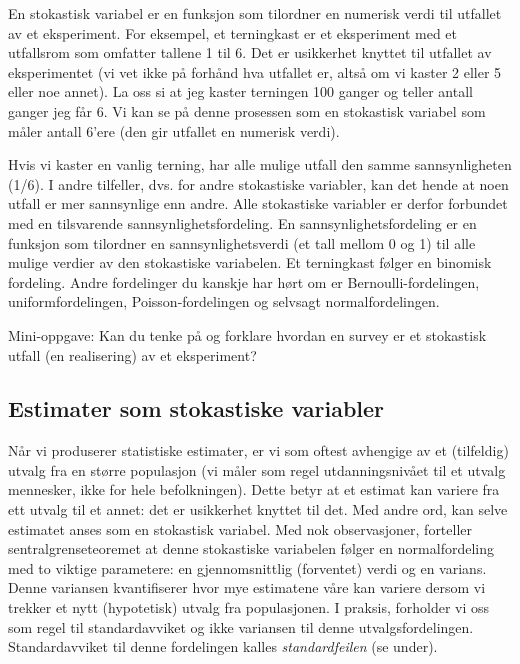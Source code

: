 \documentclass[
  norsk,
  letterpaper,
  DIV=11,
  numbers=noendperiod]{scrreprt}
\theoremstyle{definition}
\theoremstyle{remark}
\begin{document}
En stokastisk variabel er en funksjon som tilordner en numerisk verdi
til utfallet av et eksperiment. For eksempel, et terningkast er et
eksperiment med et utfallsrom som omfatter tallene 1 til 6. Det er
usikkerhet knyttet til utfallet av eksperimentet (vi vet ikke på forhånd
hva utfallet er, altså om vi kaster 2 eller 5 eller noe annet). La oss
si at jeg kaster terningen 100 ganger og teller antall ganger jeg får 6.
Vi kan se på denne prosessen som en stokastisk variabel som måler antall
6'ere (den gir utfallet en numerisk verdi).

Hvis vi kaster en vanlig terning, har alle mulige utfall den samme
sannsynligheten (1/6). I andre tilfeller, dvs. for andre stokastiske
variabler, kan det hende at noen utfall er mer sannsynlige enn andre.
Alle stokastiske variabler er derfor forbundet med en tilsvarende
sannsynlighetsfordeling. En sannsynlighetsfordeling er en funksjon som
tilordner en sannsynlighetsverdi (et tall mellom 0 og 1) til alle mulige
verdier av den stokastiske variabelen. Et terningkast følger en binomisk
fordeling. Andre fordelinger du kanskje har hørt om er
Bernoulli-fordelingen, uniformfordelingen, Poisson-fordelingen og
selvsagt normalfordelingen.

Mini-oppgave: Kan du tenke på og forklare hvordan en survey er et
stokastisk utfall (en realisering) av et eksperiment?

\subsection{Estimater som stokastiske
variabler}\label{estimater-som-stokastiske-variabler}

Når vi produserer statistiske estimater, er vi som oftest avhengige av
et (tilfeldig) utvalg fra en større populasjon (vi måler som regel
utdanningsnivået til et utvalg mennesker, ikke for hele befolkningen).
Dette betyr at et estimat kan variere fra ett utvalg til et annet: det
er usikkerhet knyttet til det. Med andre ord, kan selve estimatet anses
som en stokastisk variabel. Med nok observasjoner, forteller
sentralgrenseteoremet at denne stokastiske variabelen følger en
normalfordeling med to viktige parametere: en gjennomsnittlig
(forventet) verdi og en varians. Denne variansen kvantifiserer hvor mye
estimatene våre kan variere dersom vi trekker et nytt (hypotetisk)
utvalg fra populasjonen. I praksis, forholder vi oss som regel til
standardavviket og ikke variansen til denne utvalgsfordelingen.
Standardavviket til denne fordelingen kalles \emph{standardfeilen} (se
under).
\end{document}

